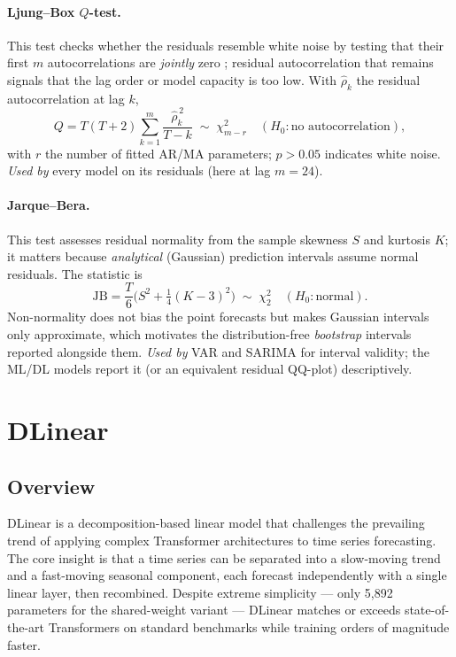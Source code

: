 \documentclass[12pt,a4paper,oneside]{report}
\begin{document}
\paragraph{Ljung--Box $Q$-test.}
This test checks whether the residuals resemble white noise by testing that their
first $m$ autocorrelations are \emph{jointly} zero \citep{box2015time}; residual
autocorrelation that remains signals that the lag order or model capacity is too low.
With $\hat\rho_k$ the residual autocorrelation at lag $k$,
\begin{equation}
  Q = T(T+2)\sum_{k=1}^{m}\frac{\hat\rho_k^{\,2}}{T-k}
  \;\sim\; \chi^2_{m-r} \quad (H_0:\text{no autocorrelation}),
  \label{eq:ljungbox}
\end{equation}
with $r$ the number of fitted AR/MA parameters; $p>0.05$ indicates white noise.
\emph{Used by} every model on its residuals (here at lag $m=24$).

\paragraph{Jarque--Bera.}
This test assesses residual normality from the sample skewness $S$ and kurtosis $K$;
it matters because \emph{analytical} (Gaussian) prediction intervals assume normal
residuals. The statistic is
\begin{equation}
  \mathrm{JB} = \frac{T}{6}\Big(S^2 + \tfrac{1}{4}(K-3)^2\Big)
  \;\sim\; \chi^2_2 \quad (H_0:\text{normal}).
  \label{eq:jarquebera}
\end{equation}
Non-normality does not bias the point forecasts but makes Gaussian intervals only
approximate, which motivates the distribution-free \emph{bootstrap} intervals reported
alongside them. \emph{Used by} VAR and SARIMA for interval validity; the ML/DL models
report it (or an equivalent residual QQ-plot) descriptively.


\section{DLinear}
\label{sec:dlinear}

\subsection{Overview}

DLinear \citep{zeng2023dlinear} is a decomposition-based linear model that
challenges the prevailing trend of applying complex Transformer architectures
to time series forecasting. The core insight is that a time series can be
separated into a slow-moving trend and a fast-moving seasonal component, each
forecast independently with a single linear layer, then recombined. Despite
extreme simplicity --- only 5,892 parameters for the shared-weight variant ---
DLinear matches or exceeds state-of-the-art Transformers on standard benchmarks
while training orders of magnitude faster.
\end{document}
